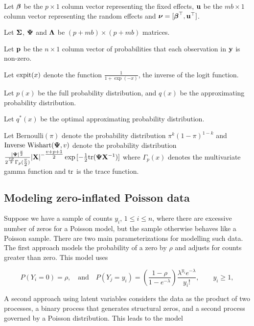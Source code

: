 \documentclass{amsart}[12pt]
\begin{document}
Let ${\boldsymbol \beta}$ be the $p \times 1$ column vector representing the fixed effects,
${\bf u}$ be the $m b \times 1$ column vector representing the random effects
and ${\boldsymbol \nu} = [{\boldsymbol \beta}^\top, {\bf u}^\top]$.

Let ${\boldsymbol \Sigma}$, ${\boldsymbol \Psi}$ and ${\boldsymbol \Lambda}$ be $(p + m b) \times (p + m b)$ matrices.

Let ${\bf p}$ be the $n \times 1$ column vector of probabilities that each observation in ${\bf y}$ is non-zero.

Let $\text{expit} (x)$ denote the function $\tfrac{1}{1 + \exp(-x)}$, the inverse of the logit function.

Let $p(x)$ be the full probability distribution, and $q(x)$ be the approximating probability distribution.

Let $q^*(x)$ be the optimal approximating probability distribution.

Let $\text{Bernoulli}(\pi)$  denote the probability distribution $\pi^k (1 - \pi)^{1-k}$
and $\text{Inverse Wishart}({\boldsymbol \Psi}, v)$ denote the probability distribution
$\tfrac{|{\boldsymbol \Psi}|^\frac{v}{2}}{2^{\frac{vp}{2}} \Gamma_p{(\tfrac{v}{2})}} |{\bf X}|^{-\tfrac{v + p + 1}{2}} \exp{[- \tfrac{1}{2} \text{tr}{({\boldsymbol\Psi}{\bf X}^{-1})}]}$ where $\Gamma_p{(x)}$ denotes the multivariate gamma function and
$\text{tr}$ is the trace function.

\subsection{Modeling zero-inflated Poisson data}

Suppose we have a sample of counts $y_i$, $1\le i\le n$, where there are excessive number of zeros  for a
Poisson model, but the sample otherwise behaves like a Poisson sample. There are two main  parameterizations
for modelling such data. The first approach models the probability of a zero by $\rho$ and adjusts for counts
greater than zero. This model uses

$$
P(Y_i = 0) = \rho, 
\quad \mbox{and} \quad 
P(Y_j = y_i) = \left( \frac{1 - \rho}{1 - e^{-\lambda}} \right) \frac{\lambda^{y_i} e^{-\lambda}} {y_i!},\qquad y_i \ge 1,
$$


\noindent A second approach using latent variables considers the data as the product of two processes, a
binary process that generates structural zeros, and a second process governed by a Poisson distribution. This
leads to the model
\end{document}
